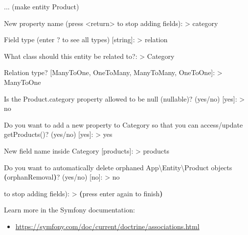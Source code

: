 \documentclass[a4paperpaper,openright]{book}
\newenvironment{Shaded}{}{}
\newcommand{\BuiltInTok}[1]{#1}
\newcommand{\ExtensionTok}[1]{#1}
\newcommand{\FunctionTok}[1]{\textcolor[rgb]{0.02,0.16,0.49}{#1}}
\newcommand{\KeywordTok}[1]{\textcolor[rgb]{0.00,0.44,0.13}{\textbf{#1}}}
\newcommand{\NormalTok}[1]{#1}
\newcommand{\OperatorTok}[1]{\textcolor[rgb]{0.40,0.40,0.40}{#1}}
\providecommand{\tightlist}{%
  \setlength{\itemsep}{0pt}\setlength{\parskip}{0pt}}
\begin{document}
\begin{Shaded}
\begin{Highlighting}[]
    \ExtensionTok{...}\NormalTok{ (make entity Product)}
    
    \ExtensionTok{New}\NormalTok{ property name (press }\OperatorTok{<}\NormalTok{return}\OperatorTok{>}\NormalTok{ to stop adding fields)}\BuiltInTok{:}
    \OperatorTok{>} \ExtensionTok{category}
    
    \ExtensionTok{Field}\NormalTok{ type (enter ? to see all types) [}\ExtensionTok{string}\NormalTok{]:}
    \OperatorTok{>} \ExtensionTok{relation}
    
    \ExtensionTok{What}\NormalTok{ class should this entity be related to?:}
    \OperatorTok{>} \ExtensionTok{Category}
    
    \ExtensionTok{Relation}\NormalTok{ type? [ManyToOne, OneToMany, ManyToMany, OneToOne]:}
    \OperatorTok{>} \ExtensionTok{ManyToOne}
    
    \ExtensionTok{Is}\NormalTok{ the Product.category property allowed to be null (nullable)}\ExtensionTok{?}\NormalTok{ (yes/no) [}\ExtensionTok{yes}\NormalTok{]:}
    \OperatorTok{>} \ExtensionTok{no}
    
    \ExtensionTok{Do}\NormalTok{ you want to add a new property to Category so that you can access/update}
    \FunctionTok{getProducts()}\ExtensionTok{?}\NormalTok{ (yes/no) [}\ExtensionTok{yes}\NormalTok{]:}
    \OperatorTok{>} \FunctionTok{yes}
    
    \ExtensionTok{New}\NormalTok{ field name inside Category [products]:}
    \OperatorTok{>} \ExtensionTok{products}
    
    \ExtensionTok{Do}\NormalTok{ you want to automatically delete orphaned App\textbackslash{}Entity\textbackslash{}Product objects}
    \KeywordTok{(}\ExtensionTok{orphanRemoval}\KeywordTok{)}\ExtensionTok{?}\NormalTok{ (yes/no) [}\ExtensionTok{no}\NormalTok{]:}
    \OperatorTok{>} \ExtensionTok{no}
    
     \ExtensionTok{to}\NormalTok{ stop adding fields)}\BuiltInTok{:}
    \OperatorTok{>}
    \KeywordTok{(}\ExtensionTok{press}\NormalTok{ enter again to finish}\KeywordTok{)}
\end{Highlighting}
\end{Shaded}

Learn more in the Symfony documentation:

\begin{itemize}
\tightlist
\item
  \url{https://symfony.com/doc/current/doctrine/associations.html}
\end{itemize}
\end{document}
